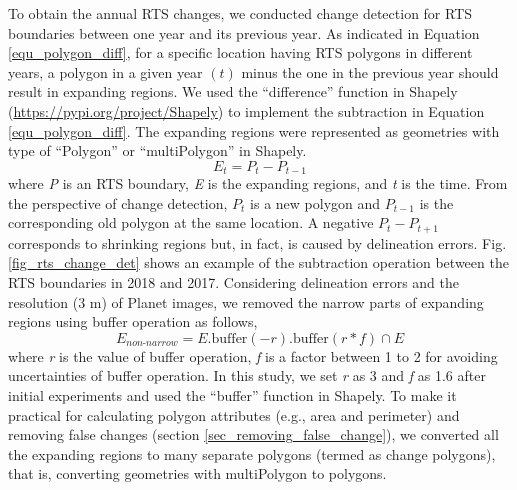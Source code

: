 \documentclass[authoryear,preprint,review,12pt]{elsarticle}
\begin{document}
To obtain the annual RTS changes, we conducted change detection for RTS boundaries between one year and its previous year. %
 As indicated in Equation \ref{equ_polygon_diff}, for a specific location having RTS polygons in different years, a polygon in a given year $(t)$ minus the one in the previous year should result in expanding regions. 
We used the ``difference'' function in Shapely (\url{https://pypi.org/project/Shapely}) to implement the subtraction in Equation \ref{equ_polygon_diff}. 
The expanding regions were represented as geometries with type of ``Polygon'' or ``multiPolygon'' in Shapely.
\begin{equation}
E_{t}= P_{t} - P_{t-1}
\label{equ_polygon_diff}
\end{equation}
where \emph{P} is an RTS boundary, \emph{E} is the expanding regions, and \emph{t} is the time. 
From the perspective of change detection, $P_{t}$ is a new polygon and $P_{t-1}$ is the corresponding old polygon at the same location. 
A negative $P_{t} - P_{t+1}$ corresponds to shrinking regions but, in fact, is caused by delineation errors. 
Fig. \ref{fig_rts_change_det} shows an example of the subtraction operation between the RTS boundaries in 2018 and 2017. 
Considering delineation errors and the resolution (3 m) of Planet images, we removed the narrow parts of expanding regions using buffer operation as follows, 
\begin{equation}
E_{non\text{-}narrow}= E.\text{buffer}(-r).\text{buffer}(r*f) \cap E
\label{equ_polygon_buffer}
\end{equation}
where \emph{r} is the value of buffer operation,  \emph{f} is a factor between 1 to 2 for avoiding uncertainties of buffer operation. 
In this study, we set \emph{r} as 3 and \emph{f} as 1.6 after initial experiments and used the ``buffer'' function in Shapely.
To make it practical for calculating polygon attributes (e.g., area and perimeter) and removing false changes (section \ref{sec_removing_false_change}), we converted all the expanding regions to many separate polygons (termed as change polygons), that is, converting geometries with multiPolygon to polygons.



\end{document}
